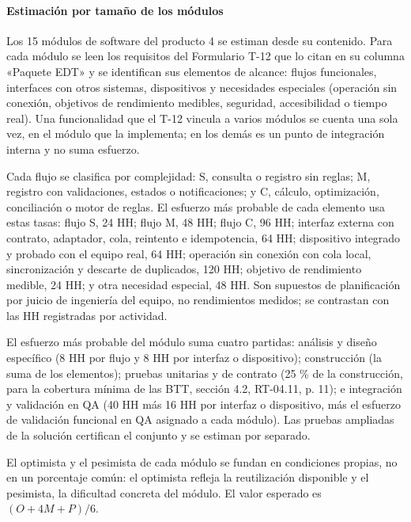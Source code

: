 \paragraph{Estimación por tamaño de los módulos}
Los 15 módulos de software del producto 4 se estiman desde su contenido. Para cada módulo se leen los requisitos del Formulario T-12 que lo citan en su columna «Paquete EDT» y se identifican sus elementos de alcance: flujos funcionales, interfaces con otros sistemas, dispositivos y necesidades especiales (operación sin conexión, objetivos de rendimiento medibles, seguridad, accesibilidad o tiempo real). Una funcionalidad que el T-12 vincula a varios módulos se cuenta una sola vez, en el módulo que la implementa; en los demás es un punto de integración interna y no suma esfuerzo.

Cada flujo se clasifica por complejidad: S, consulta o registro sin reglas; M, registro con validaciones, estados o notificaciones; y C, cálculo, optimización, conciliación o motor de reglas. El esfuerzo más probable de cada elemento usa estas tasas: flujo S, 24 HH; flujo M, 48 HH; flujo C, 96 HH; interfaz externa con contrato, adaptador, cola, reintento e idempotencia, 64 HH; dispositivo integrado y probado con el equipo real, 64 HH; operación sin conexión con cola local, sincronización y descarte de duplicados, 120 HH; objetivo de rendimiento medible, 24 HH; y otra necesidad especial, 48 HH. Son supuestos de planificación por juicio de ingeniería del equipo, no rendimientos medidos; se contrastan con las HH registradas por actividad.

El esfuerzo más probable del módulo suma cuatro partidas: análisis y diseño específico (8 HH por flujo y 8 HH por interfaz o dispositivo); construcción (la suma de los elementos); pruebas unitarias y de contrato (25 \% de la construcción, para la cobertura mínima de las BTT, sección 4.2, RT-04.11, p. 11); e integración y validación en QA (40 HH más 16 HH por interfaz o dispositivo, más el esfuerzo de validación funcional en QA asignado a cada módulo). Las pruebas ampliadas de la solución certifican el conjunto y se estiman por separado.


El optimista y el pesimista de cada módulo se fundan en condiciones propias, no en un porcentaje común: el optimista refleja la reutilización disponible y el pesimista, la dificultad concreta del módulo. El valor esperado es $(O+4M+P)/6$.


